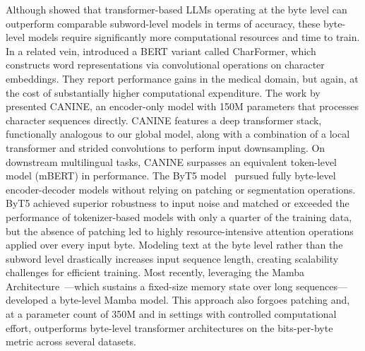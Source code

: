 Although \cite{Choe2019BridgingTG} showed that transformer-based LLMs operating at the byte level can outperform comparable subword-level models in terms of accuracy, these byte-level models require significantly more computational resources and time to train. In a related vein, \cite{el2020characterbert} introduced a BERT variant called CharFormer, which constructs word representations via convolutional operations on character embeddings. They report performance gains in the medical domain, but again, at the cost of substantially higher computational expenditure. The work by \cite{clark2022canine} presented CANINE, an encoder-only model with 150M parameters that processes character sequences directly. CANINE features a deep transformer stack, functionally analogous to our global model, along with a combination of a local transformer and strided convolutions to perform input downsampling. On downstream multilingual tasks, CANINE surpasses an equivalent token-level model (mBERT) in performance. The ByT5 model~\citep{xue2022byt5} pursued fully byte-level encoder-decoder models without relying on patching or segmentation operations. ByT5 achieved superior robustness to input noise and matched or exceeded the performance of tokenizer-based models with only a quarter of the training data, but the absence of patching led to highly resource-intensive attention operations applied over every input byte. Modeling text at the byte level rather than the subword level drastically increases input sequence length, creating scalability challenges for efficient training. Most recently, leveraging the Mamba Architecture~\citep{gu2023mamba}—which sustains a fixed-size memory state over long sequences—\cite{wang2024mambabyte} developed a byte-level Mamba model. This approach also forgoes patching and, at a parameter count of 350M and in settings with controlled computational effort, outperforms byte-level transformer architectures on the bits-per-byte metric across several datasets.

